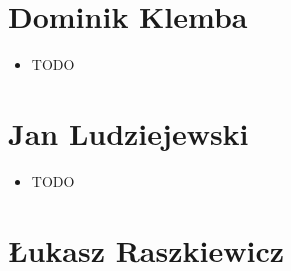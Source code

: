     \section{Dominik Klemba}
        \begin{itemize}
            \item TODO
        \end{itemize}

    \section{Jan Ludziejewski}
        \begin{itemize}
            \item TODO
        \end{itemize}

    \section{Łukasz Raszkiewicz}
